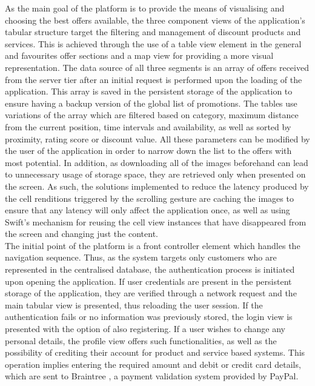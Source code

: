 As the main goal of the platform is to provide the means of visualising and choosing the best offers available, the three component views of the application's tabular structure target the filtering and management of discount products and services. This is achieved through the use of a table view element in the general and favourites offer sections and a map view for providing a more visual representation. The data source of all three segments is an array of offers received from the server tier after an initial request is performed upon the loading of the application. This array is saved in the persistent storage of the application to ensure having a backup version of the global list of promotions. The tables use variations of the array which are filtered based on category, maximum distance from the current position, time intervals and availability, as well as sorted by proximity, rating score or discount value. All these parameters can be modified by the user of the application in order to narrow down the list to the offers with most potential. In addition, as downloading all of the images beforehand can lead to unnecessary usage of storage space, they are retrieved only when presented on the screen. As such, the solutions implemented to reduce the latency produced by the cell renditions triggered by the scrolling gesture are caching the images to ensure that any latency will only affect the application once, as well as using Swift's mechanism for reusing the cell view instances that have disappeared from the screen and changing just the content.  \\

The initial point of the platform is a front controller element which handles the navigation sequence. Thus, as the system targets only customers who are represented in the centralised database, the authentication process is initiated upon opening the application. If user credentials are present in the persistent storage of the application, they are verified through a network request and the main tabular view is presented, thus reloading the user session. If the authentication fails or no information was previously stored, the login view is presented with the option of also registering. If a user wishes to change any personal details, the profile view offers such functionalities, as well as the possibility of crediting their account for product and service based systems. This operation implies entering the required amount and debit or credit card details, which are sent to Braintree \cite{braintree}, a payment validation system provided by PayPal. \\

